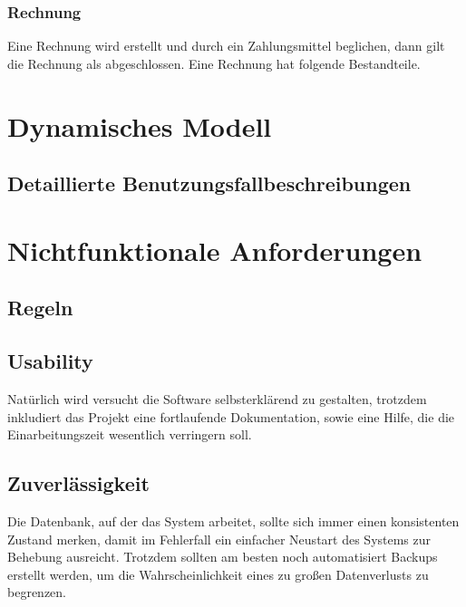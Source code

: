 \documentclass[10pt,a4paper,titlepage]{article}
\begin{document}
\subsubsection{Rechnung}
Eine Rechnung wird erstellt und durch ein Zahlungsmittel beglichen, dann gilt die Rechnung als abgeschlossen. Eine Rechnung hat folgende Bestandteile.

\newpage

\section{Dynamisches Modell}
\subsection{Detaillierte Benutzungsfallbeschreibungen}













\newpage

\section{Nichtfunktionale Anforderungen}
\subsection{Regeln}
\subsection{Usability}
Natürlich wird versucht die Software selbsterklärend zu gestalten, trotzdem inkludiert das Projekt eine fortlaufende Dokumentation, sowie eine Hilfe, die die Einarbeitungszeit wesentlich verringern soll.
\subsection{Zuverlässigkeit}
Die Datenbank, auf der das System arbeitet, sollte sich immer einen konsistenten Zustand merken, damit im Fehlerfall ein einfacher Neustart des Systems zur Behebung ausreicht. Trotzdem sollten am besten noch automatisiert Backups erstellt werden, um die Wahrscheinlichkeit eines zu großen Datenverlusts zu begrenzen.
\end{document}
